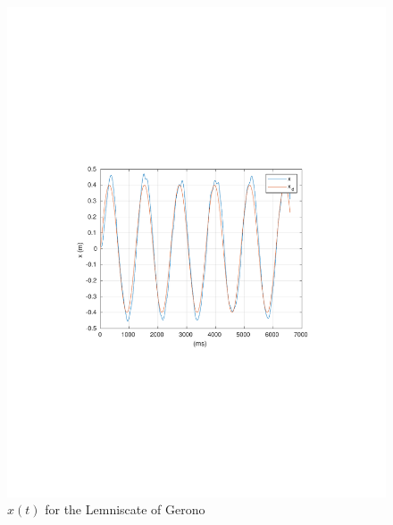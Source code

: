 \begin{frame} 
 \begin{figure}[!htb]
 	\centering
 	\includegraphics[scale=0.7,trim={3.5cm 8cm 4cm 8cm},clip]{figuras/CROB_Fuzzy_Gerono/x.pdf}
 	\caption{$x(t)$ for the Lemniscate of Gerono}
 	\label{fig:crob_lem_x}
 \end{figure}
\end{frame}
